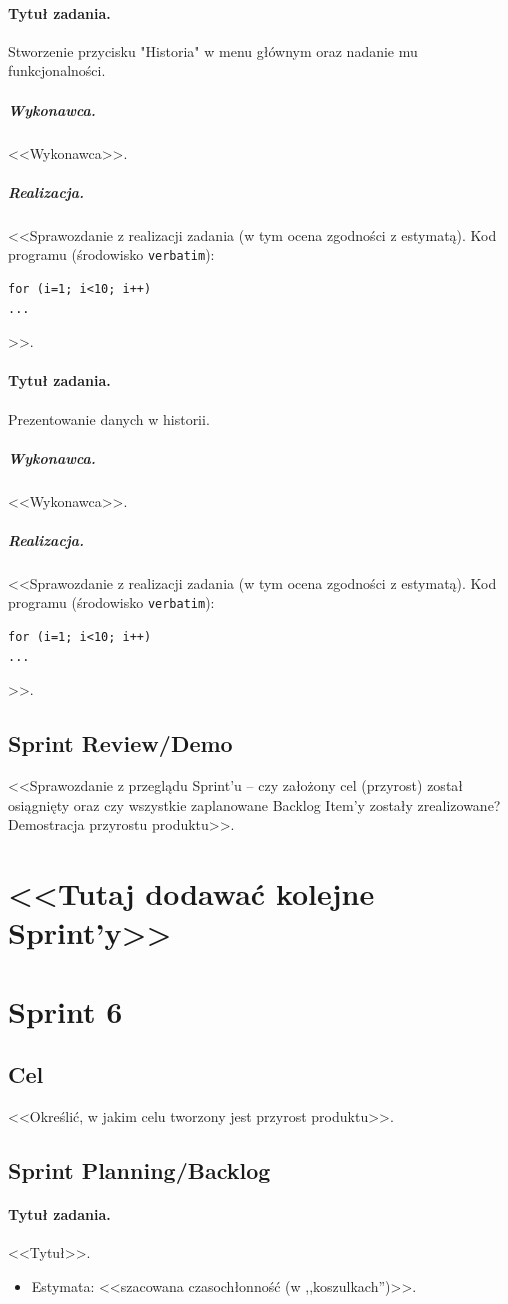 \documentclass[a4paper]{article}
\begin{document}
\paragraph{Tytuł zadania.} Stworzenie przycisku "Historia" w menu głównym oraz nadanie mu funkcjonalności.
\subparagraph{Wykonawca.} <<Wykonawca>>.
\subparagraph{Realizacja.} <<Sprawozdanie z realizacji zadania (w tym ocena zgodności z estymatą). Kod programu (środowisko \texttt{verbatim}): \begin{verbatim}
for (i=1; i<10; i++)
...
\end{verbatim}>>.

\paragraph{Tytuł zadania.} Prezentowanie danych w historii.
\subparagraph{Wykonawca.} <<Wykonawca>>.
\subparagraph{Realizacja.} <<Sprawozdanie z realizacji zadania (w tym ocena zgodności z estymatą). Kod programu (środowisko \texttt{verbatim}): \begin{verbatim}
for (i=1; i<10; i++)
...
\end{verbatim}>>.

\subsection{Sprint Review/Demo}
<<Sprawozdanie z przeglądu Sprint'u -- czy założony cel (przyrost) został osiągnięty oraz czy wszystkie zaplanowane Backlog Item'y zostały zrealizowane? Demostracja przyrostu produktu>>.
\section*{<<Tutaj dodawać kolejne Sprint'y>>}

\section{Sprint 6}

\subsection{Cel} <<Określić, w jakim celu tworzony jest przyrost produktu>>.

\subsection{Sprint Planning/Backlog}

\paragraph{Tytuł zadania.} <<Tytuł>>.
\begin{itemize}
\item Estymata: <<szacowana czasochłonność (w ,,koszulkach'')>>.
\end{itemize}
\end{document}
